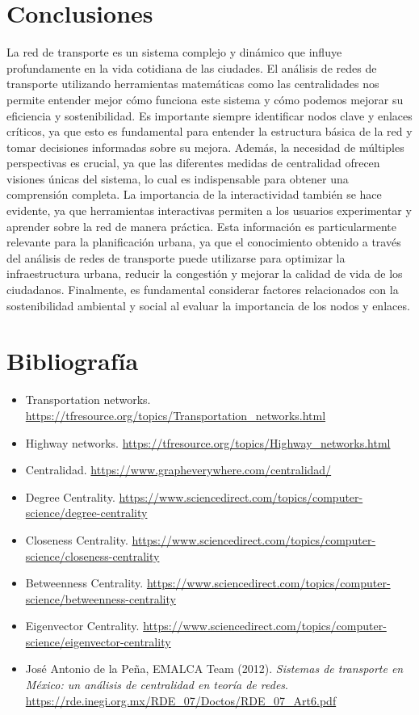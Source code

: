 \documentclass[12pt]{article}
\begin{document}
\section{Conclusiones}

La red de transporte es un sistema complejo y dinámico que influye profundamente en la vida cotidiana de las ciudades. El análisis de redes de transporte utilizando herramientas matemáticas como las centralidades nos permite entender mejor cómo funciona este sistema y cómo podemos mejorar su eficiencia y sostenibilidad. Es importante siempre identificar nodos clave y enlaces críticos, ya que esto es fundamental para entender la estructura básica de la red y tomar decisiones informadas sobre su mejora. Además, la necesidad de múltiples perspectivas es crucial, ya que las diferentes medidas de centralidad ofrecen visiones únicas del sistema, lo cual es indispensable para obtener una comprensión completa. La importancia de la interactividad también se hace evidente, ya que herramientas interactivas permiten a los usuarios experimentar y aprender sobre la red de manera práctica. Esta información es particularmente relevante para la planificación urbana, ya que el conocimiento obtenido a través del análisis de redes de transporte puede utilizarse para optimizar la infraestructura urbana, reducir la congestión y mejorar la calidad de vida de los ciudadanos. Finalmente, es fundamental considerar factores relacionados con la sostenibilidad ambiental y social al evaluar la importancia de los nodos y enlaces.

\section{Bibliografía}

\begin{itemize}
    \item Transportation networks.  \url{https://tfresource.org/topics/Transportation_networks.html}
    \item Highway networks. \url{https://tfresource.org/topics/Highway_networks.html}
    \item Centralidad. \url{https://www.grapheverywhere.com/centralidad/}
    \item Degree Centrality. \url{https://www.sciencedirect.com/topics/computer-science/degree-centrality}
    \item Closeness Centrality. \url{https://www.sciencedirect.com/topics/computer-science/closeness-centrality}
    \item Betweenness Centrality. \url{https://www.sciencedirect.com/topics/computer-science/betweenness-centrality}
    \item Eigenvector Centrality.  \url{https://www.sciencedirect.com/topics/computer-science/eigenvector-centrality}
    \item José Antonio de la Peña, EMALCA Team (2012). \textit{Sistemas de transporte en México: un análisis de centralidad en teoría de redes}.  \url{https://rde.inegi.org.mx/RDE_07/Doctos/RDE_07_Art6.pdf}
\end{itemize}
\end{document}
